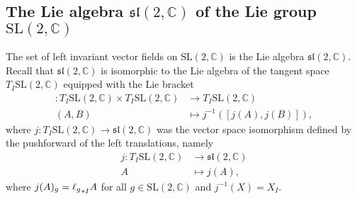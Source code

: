 \subsection{The Lie algebra \texorpdfstring{\(\mathfrak{sl}(2, \mathbb{C})\)}{sl(2,C)} of the Lie group \texorpdfstring{\(\mathrm{SL}(2,\mathbb{C})\)}{(2,C)}}
The set of left invariant vector fields on \(\mathrm{SL}(2,\mathbb{C})\) is the Lie algebra \(\mathfrak{sl}(2, \mathbb{C})\). Recall that \(\mathfrak{sl}(2,\mathbb{C})\) is isomorphic to the Lie algebra of the tangent space \(T_I\mathrm{SL}(2, \mathbb{C})\) equipped with the Lie bracket
\begin{align*}
    [ \cdot, \cdot] : T_I\mathrm{SL}(2,\mathbb{C}) \times T_I\mathrm{SL}(2,\mathbb{C}) &\to T_I\mathrm{SL}(2,\mathbb{C})\\
    (A,B) &\mapsto j^{-1}\left([j(A), j(B)]\right),
\end{align*}
where \(j : T_I\mathrm{SL}(2,\mathbb{C}) \to \mathfrak{sl}(2,\mathbb{C})\) was the vector space isomorphism defined by the pushforward of the left translations, namely
\begin{align*}
    j : T_I\mathrm{SL}(2,\mathbb{C}) &\to \mathfrak{sl}(2,\mathbb{C})\\
                          A &\mapsto j(A),
\end{align*}
where \(j(A)_g = \pf[I]{\ell_g}A\) for all \(g \in \mathrm{SL}(2,\mathbb{C})\) and \(j^{-1}(X) = X_I\).

